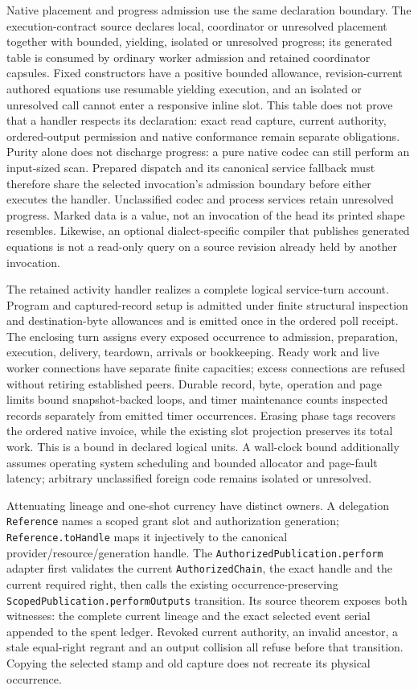 \documentclass[11pt]{article}
\theoremstyle{definition}
\theoremstyle{remark}
\begin{document}
Native placement and progress admission use the same declaration boundary.
The execution-contract source declares local, coordinator or unresolved
placement together with bounded, yielding, isolated or unresolved progress;
its generated table is consumed by ordinary worker admission and retained
coordinator capsules.  Fixed constructors have a positive bounded allowance,
revision-current authored equations use resumable yielding execution, and an
isolated or unresolved call cannot enter a responsive inline slot.  This table
does not prove that a handler respects its declaration: exact read capture,
current authority, ordered-output permission and native conformance remain
separate obligations.  Purity alone does not discharge progress: a pure native
codec can still perform an input-sized scan.  Prepared dispatch and its
canonical service fallback must therefore share the selected invocation's
admission boundary before either executes the handler.  Unclassified codec
and process services retain unresolved progress.  Marked data is a value,
not an invocation of the head its printed shape resembles.  Likewise, an
optional dialect-specific compiler that publishes generated equations is not
a read-only query on a source revision already held by another invocation.

The retained activity handler realizes a complete logical service-turn
account.  Program and captured-record setup is admitted under finite structural
inspection and destination-byte allowances and is emitted once in the ordered
poll receipt.  The enclosing turn assigns every exposed occurrence to
admission, preparation, execution, delivery, teardown, arrivals or
bookkeeping.  Ready work and live worker connections have separate finite
capacities; excess connections are refused without retiring established
peers.  Durable record, byte, operation and page limits bound snapshot-backed
loops, and timer maintenance counts inspected records separately from emitted
timer occurrences.  Erasing phase tags recovers the ordered native invoice,
while the existing slot projection preserves its total work.  This is a bound
in declared logical units.  A wall-clock bound additionally assumes operating
system scheduling and bounded allocator and page-fault latency; arbitrary
unclassified foreign code remains isolated or unresolved.

Attenuating lineage and one-shot currency have distinct owners.  A delegation
\nolinkurl{Reference} names a scoped grant slot and authorization generation;
\nolinkurl{Reference.toHandle} maps it injectively to the canonical
provider/resource/generation handle.  The
\nolinkurl{AuthorizedPublication.perform} adapter first validates the current
\nolinkurl{AuthorizedChain}, the exact handle and the current required right,
then calls the existing occurrence-preserving
\nolinkurl{ScopedPublication.performOutputs} transition.  Its source theorem
exposes both witnesses: the complete current lineage and the exact selected
event serial appended to the spent ledger.  Revoked current authority, an
invalid ancestor, a stale equal-right regrant and an output collision all
refuse before that transition.  Copying the selected stamp and old capture
does not recreate its physical occurrence.
\end{document}
